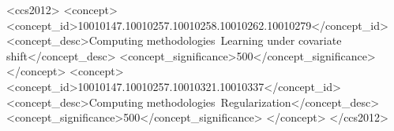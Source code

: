 \documentclass[sigconf]{acmart}
\begin{document}
%
%
\begin{CCSXML}
<ccs2012>
<concept>
<concept_id>10010147.10010257.10010258.10010262.10010279</concept_id>
<concept_desc>Computing methodologies~Learning under covariate shift</concept_desc>
<concept_significance>500</concept_significance>
</concept>
<concept>
<concept_id>10010147.10010257.10010321.10010337</concept_id>
<concept_desc>Computing methodologies~Regularization</concept_desc>
<concept_significance>500</concept_significance>
</concept>
</ccs2012>
\end{CCSXML}


\maketitle
\end{document}
